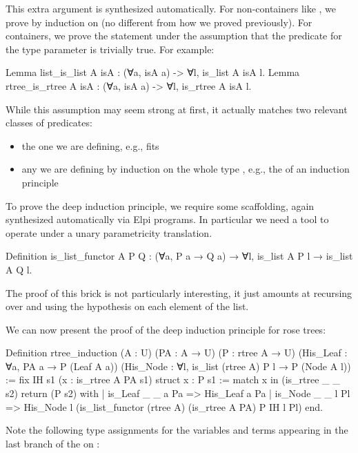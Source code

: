 \documentclass{these-ISSS}
\newenvironment{rocqcode}
  {\VerbatimEnvironment\begin{rocqbox}\begin{xrocqcode}}{\end{xrocqcode}
\end{rocqbox}}
\begin{document}
This extra argument is synthesized
automatically.
For non-containers like , we prove  by induction
on  (no different from how we proved  previously). For
containers, we prove the statement under the assumption that the predicate for
the type parameter is trivially true. For example:

\begin{rocqcode}
Lemma list_is_list A isA : (∀a, isA a) -> ∀l, is_list A isA l.
Lemma rtree_is_rtree A isA : (∀a, isA a) -> ∀l, is_rtree A isA l.
\end{rocqcode}

While this assumption may seem strong at first, it actually matches two
relevant classes of predicates:
\begin{itemize}
  \item the one we are defining, e.g.,  fits
  \item any  we are defining by induction on the whole type
    , e.g., the  of an induction principle
\end{itemize}

To prove the deep induction principle, we require some scaffolding, again
synthesized automatically via Elpi programs. In particular we need
a tool to operate under a unary parametricity translation.

\begin{rocqcode}
Definition is_list_functor A P Q :
  (∀a, P a → Q a) → ∀l, is_list A P l → is_list A Q l.
\end{rocqcode}

\noindent
The proof of this brick is not particularly interesting, it just
amounts at recursing over  and using the hypothesis
on each element of the list.

We can
now present the proof of the deep induction principle for rose trees:

\begin{rocqcode}
Definition rtree_induction (A : U) (PA : A → U) (P : rtree A → U)
    (His_Leaf : ∀a, PA a → P (Leaf A a))
    (His_Node : ∀l, is_list (rtree A) P l → P (Node A l))
:=
  fix IH s1 (x : is_rtree A PA s1) {struct x} : P s1 :=
  match x in (is_rtree _ _ s2) return (P s2) with
  | is_Leaf _ _ a Pa =>
      His_Leaf a Pa
  | is_Node _ _ l Pl =>
      His_Node l (is_list_functor (rtree A) (is_rtree A PA) P IH l Pl)
  end.
\end{rocqcode}

Note the following type assignments for the variables and terms appearing in
the last branch of the  on :
\end{document}

